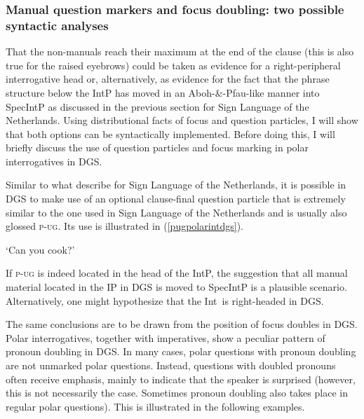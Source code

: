 \largerpage
\subsubsection{Manual question markers and focus doubling: two possible syntactic analyses}\label{manualquestionmarkers}
That the non-manuals reach their maximum at the end of the clause (this is also true for the raised eyebrows) could be taken as evidence for a right-peripheral interrogative head or, alternatively, as evidence for the fact that the phrase structure below the IntP has moved in an Aboh-\&-Pfau-like manner into SpecIntP as discussed in the previous section for Sign Language of the Netherlands. Using distributional facts of focus and question particles, I will show that both options can be syntactically implemented. Before doing this, I will briefly discuss the use of question particles and focus marking in polar interrogatives in DGS.

Similar to what \citet{aboh2010sa} describe for Sign Language of the Netherlands, it is possible in DGS to make use of an optional clause-final question particle that is extremely similar to the one used in Sign Language of the Netherlands and is usually also glossed \textsc{p-ug}. Its use is illustrated in (\ref{pugpolarintdgs}).

\begin{exe}
\ex {}
\glt `Can you cook?'\label{pugpolarintdgs}
\end{exe}

\noindent If \textsc{p-ug} is indeed located in the head of the IntP, the suggestion that all manual material located in the IP in DGS is moved to SpecIntP is a plausible scenario. Alternatively, one might hypothesize that the Int\textdegree\ is right-headed in DGS. 

\largerpage
The same conclusions are to be drawn from the position of focus doubles in DGS. Polar interrogatives, together with imperatives, show a peculiar pattern of pronoun doubling in DGS. In many cases, polar questions with pronoun doubling are not unmarked polar questions. Instead, questions with doubled pronouns often receive emphasis, mainly to indicate that the speaker is surprised (however, this is not necessarily the case. Sometimes pronoun doubling also takes place in regular polar questions). This is illustrated in the following examples.

